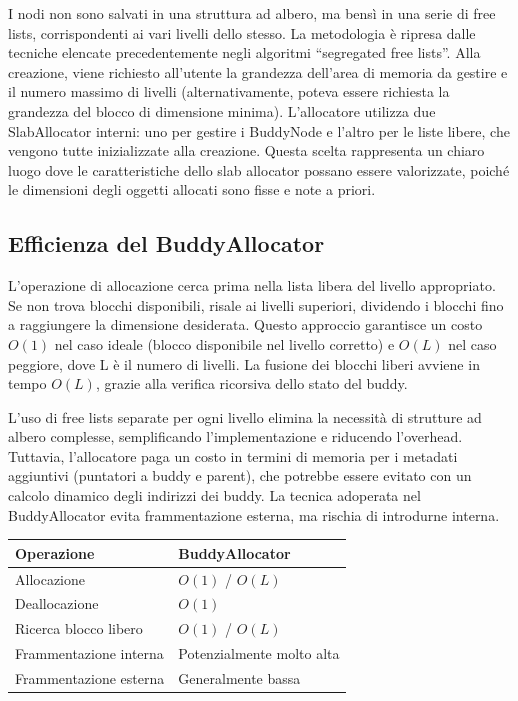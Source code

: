 I nodi non sono salvati in una struttura ad albero, ma bensì in una serie di free lists, corrispondenti ai vari livelli dello stesso. La metodologia è ripresa dalle tecniche elencate precedentemente negli algoritmi “segregated free lists”. Alla creazione, viene richiesto all’utente la grandezza dell’area di memoria da gestire e il numero massimo di livelli (alternativamente, poteva essere richiesta la grandezza del blocco di dimensione minima). L'allocatore utilizza due SlabAllocator interni: uno per gestire i BuddyNode e l'altro per le liste libere, che vengono tutte inizializzate alla creazione. Questa scelta rappresenta un chiaro luogo dove le caratteristiche dello slab allocator possano essere valorizzate, poiché le dimensioni degli oggetti allocati sono fisse e note a priori.

\subsection*{Efficienza del BuddyAllocator}
L'operazione di allocazione cerca prima nella lista libera del livello appropriato. Se non trova blocchi disponibili, risale ai livelli superiori, dividendo i blocchi fino a raggiungere la dimensione desiderata. Questo approccio garantisce un costo $O(1)$ nel caso ideale (blocco disponibile nel livello corretto) e $O(L)$ nel caso peggiore, dove L è il numero di livelli. La fusione dei blocchi liberi avviene in tempo $O(L)$, grazie alla verifica ricorsiva dello stato del buddy.

L'uso di free lists separate per ogni livello elimina la necessità di strutture ad albero complesse, semplificando l'implementazione e riducendo l'overhead. Tuttavia, l'allocatore paga un costo in termini di memoria per i metadati aggiuntivi (puntatori a buddy e parent), che potrebbe essere evitato con un calcolo dinamico degli indirizzi dei buddy. La tecnica adoperata nel BuddyAllocator evita frammentazione esterna, ma rischia di introdurne interna.

\begin{center}
\begin{tabular}{|l|l|}
\hline
Operazione & BuddyAllocator \\
\hline
Allocazione & $O(1)$ / $O(L)$ \\
Deallocazione & $O(1)$ \\
Ricerca blocco libero & $O(1)$ / $O(L)$ \\
Frammentazione interna & Potenzialmente molto alta \\
Frammentazione esterna & Generalmente bassa \\
\hline
\end{tabular}
\end{center}

